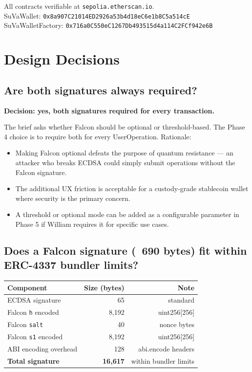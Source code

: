 \documentclass[11pt,a4paper]{article}
\begin{document}
\begin{infobox}
All contracts verifiable at \texttt{sepolia.etherscan.io}.\\
SuVaWallet: \texttt{0x8a907C21014ED2926a53b4d18eC6e1b8C5a514cE}\\
SuVaWalletFactory: \texttt{0x716a0C550eC1267Db493515d4a114C2FCf942e6B}
\end{infobox}

\section{Design Decisions}

\subsection{Are both signatures always required?}

\textbf{Decision: yes, both signatures required for every transaction.}

The brief asks whether Falcon should be optional or threshold-based. The Phase 4 choice
is to require both for every UserOperation. Rationale:
\begin{itemize}
  \item Making Falcon optional defeats the purpose of quantum resistance --- an attacker
        who breaks ECDSA could simply submit operations without the Falcon signature.
  \item The additional UX friction is acceptable for a custody-grade stablecoin wallet
        where security is the primary concern.
  \item A threshold or optional mode can be added as a configurable parameter in Phase 5
        if William requires it for specific use cases.
\end{itemize}

\subsection{Does a Falcon signature (~690 bytes) fit within ERC-4337 bundler limits?}

\begin{center}
\begin{tabular}{lrr}
\toprule
\textbf{Component} & \textbf{Size (bytes)} & \textbf{Note} \\
\midrule
ECDSA signature    &    65 & standard \\
Falcon \texttt{h} encoded  & 8,192 & uint256[256] \\
Falcon \texttt{salt}       &    40 & nonce bytes \\
Falcon \texttt{s1} encoded & 8,192 & uint256[256] \\
ABI encoding overhead      &   128 & abi.encode headers \\
\midrule
\textbf{Total signature} & \textbf{16,617} & within bundler limits \\
\bottomrule
\end{tabular}
\end{center}
\end{document}
